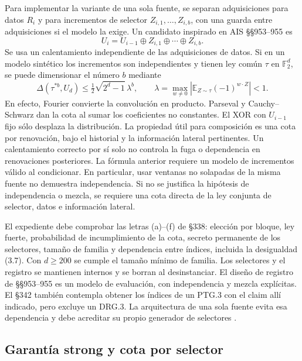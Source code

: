 \documentclass[11pt,a4paper]{article}
\begin{document}
Para implementar la variante de una sola fuente, se separan
adquisiciones para datos \(R_i\) y para incrementos de selector
\(Z_{i,1},\ldots,Z_{i,b}\), con una guarda entre adquisiciones si el
modelo la exige. Un candidato inspirado en AIS §§953--955 es
\[
 U_i=U_{i-1}\oplus Z_{i,1}\oplus\cdots\oplus Z_{i,b}.
\]
Se usa un calentamiento independiente de las adquisiciones de datos.
Si en un modelo sintético los incrementos son independientes y
tienen ley común \(\tau\) en \(\mathbb F_2^d\), se puede dimensionar
el número \(b\) mediante
\[
 \Delta\left(\tau^{*b},U_d\right)
 \le \tfrac12\sqrt{2^d-1}\,\lambda^b,\qquad
 \lambda=\max_{w\ne0}\left|
     \mathbb E_{Z\sim\tau}(-1)^{w\cdot Z}\right|<1.
\]
En efecto, Fourier convierte la convolución en producto. Parseval
y Cauchy--Schwarz dan la cota al sumar los coeficientes no constantes.
El XOR con \(U_{i-1}\) fijo sólo desplaza la distribución. La propiedad
útil para composición es una cota por renovación, bajo el historial
y la información lateral pertinentes. Un calentamiento correcto por
sí solo no controla la fuga o dependencia en renovaciones posteriores.
La fórmula anterior requiere un modelo de incrementos válido al
condicionar. En particular, usar ventanas no solapadas de la misma
fuente no demuestra independencia. Si no se justifica la hipótesis
de independencia o mezcla, se requiere una cota directa de la ley
conjunta de selector, datos e información lateral.

El expediente debe comprobar las letras (a)--(f) de §338: elección
por bloque, ley fuerte, probabilidad de incumplimiento de la cota,
secreto permanente de los selectores, tamaño de familia y dependencia
entre índices, incluida la desigualdad (3.7). Con \(d\ge200\) se
cumple el tamaño mínimo de familia. Los selectores y el registro
se mantienen internos y se borran al desinstanciar. El diseño de
registro de §§953--955 es un modelo de evaluación, con independencia
y mezcla explícitas. El §342 también contempla obtener los índices
de un PTG.3 con el claim allí indicado, pero excluye un DRG.3.
La arquitectura de una sola fuente evita esa dependencia y debe
acreditar su propio generador de selectores
\cite[§§337--342 y 951--955]{ais}.

\subsection{Garantía strong y cota por selector}
\end{document}
